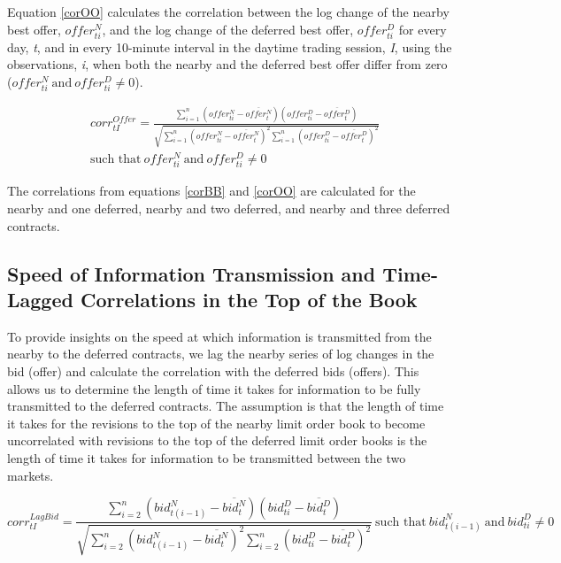 \documentclass[review,12pt]{elsarticle}
\begin{document}
Equation \ref{corOO} calculates the correlation between the log change
of the nearby best offer, \(offer_{ti}^N\), and the log change of the
deferred best offer, \(offer_{ti}^D\) for every day, \emph{t}, and in
every 10-minute interval in the daytime trading session, \emph{I}, using
the observations, \emph{i}, when both the nearby and the deferred best
offer differ from zero
(\({offer_{ti}^N \: \textrm{and} \: offer_{ti}^D} \neq 0\)).

\begin{equation} \label{corOO}
\begin{split}
& corr^{Offer}_{tI} = \frac{\sum\limits_{i=1}^{n} \left(offer_{ti}^N - \overline{offer_t^N}\right) \left(offer_{ti}^D - \overline{offer_t^D}\right)}{\sqrt{\sum\limits_{i=1}^{n} \left(offer_{ti}^N - \overline{offer_t^N}\right)^2 \sum\limits_{i=1}^{n}\left(offer_{ti}^D - \overline{offer_t^D}\right)^2}} \\
& \textrm{such that} \: {offer_{ti}^N \: \textrm{and} \: offer_{ti}^D} \neq 0 
\end{split}
\end{equation}

The correlations from equations \ref{corBB} and \ref{corOO} are
calculated for the nearby and one deferred, nearby and two deferred, and
nearby and three deferred contracts.

\subsection{Speed of Information Transmission and Time-Lagged
Correlations in the Top of the
Book}\label{speed-of-information-transmission-and-time-lagged-correlations-in-the-top-of-the-book}

To provide insights on the speed at which information is transmitted
from the nearby to the deferred contracts, we lag the nearby series of
log changes in the bid (offer) and calculate the correlation with the
deferred bids (offers). This allows us to determine the length of time
it takes for information to be fully transmitted to the deferred
contracts. The assumption is that the length of time it takes for the
revisions to the top of the nearby limit order book to become
uncorrelated with revisions to the top of the deferred limit order books
is the length of time it takes for information to be transmitted between
the two markets.

\begin{equation} \label{corLBB}
corr^{LagBid}_{tI} = \frac{\sum\limits_{i=2}^{n} \left(bid_{t(i-1)}^N - \overline{bid_t^N}\right) \left(bid_{ti}^D - \overline{bid_t^D}\right)}{\sqrt{\sum\limits_{i=2}^{n} \left(bid_{t(i-1)}^N - \overline{bid_t^N}\right)^2 \sum\limits_{i=2}^{n}\left(bid_{ti}^D - \overline{bid_t^D}\right)^2}} \: \textrm{such that} \: {bid_{t(i-1)}^N \: \textrm{and} \: bid_{ti}^D} \neq 0
\end{equation}
\end{document}
